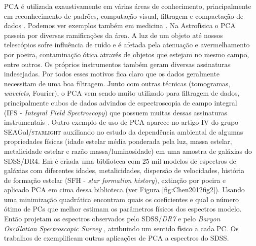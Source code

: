 \documentclass[a4paper,12pt]{article}
\def\starlight{\textsc{starlight}\xspace}      %
\def\SDSS{SDSS\xspace}           %
\begin{document}
PCA é utilizada exaustivamente em várias áreas de conhecimento, principalmente em reconhecimento de padrões, computação visual, filtragem e
compactação de dados \citep{Kamruzzaman2010, Borcea2012}. Podemos ver exemplos também em medicina \citep{Balakrishnan2013}. Na Astrofísica o PCA
passeia por diversas ramificações da área. A luz de um objeto até nossos telescópios sofre influência de ruído e é afetada pela atenuação e
avermelhamento por poeira, contaminação ótica através de objetos que estejam no mesmo campo, entre outros. Os próprios instrumentos também geram
diversas assinaturas indesejadas. Por todos esses motivos fica claro que os dados geralmente necessitam de uma boa filtragem. Junto com outras
técnicas (tomogramas, {\em wavelets}, Fourier), o PCA vem sendo muito utilizado para filtragem de dados, principalmente cubos de dados advindos de
espectroscopia de campo integral (IFS - {\em Integral Field Spectroscopy}) que possuem muitas dessas assinaturas instrumentais \citep{Riffel2011}.
Outro exemplo de uso de PCA aparece no artigo IV do grupo SEAGal/\starlight \citep{Mateus2007} auxiliando no estudo da dependência ambiental de
algumas propriedades físicas (idade estelar média ponderada pela luz, massa estelar, metalicidade estelar e razão massa/luminosidade) em uma amostra
de galáxias do \SDSS/DR4. Em \citet{Chen2012} é criada uma biblioteca com $25$ mil modelos de espectros de galáxias com diferentes idades,
metalicidades, dispersão de velocidades, história de formação estelar (SFH - {\em star formation history}), extinção por poeira e aplicado PCA em cima
dessa biblioteca (ver Figura \ref{fig:Chen2012fig2}). Usando uma minimização quadrática encontram quais os coeficientes e qual o número ótimo de PCs
que melhor estimam os parâmetros físicos dos espectros modelo. Então projetam os espectros observados pelo \SDSS/{\em DR7} \citep{Abazajian2009} e
pelo {\em Baryon Oscillation Spectroscopic Survey} \citep[BOSS;][]{Ahn2012}, atribuindo um sentido físico a cada PC. Os trabalhos de
\citet{Ferreras2006, Wild2006, Rogers2007} exemplificam outras aplicações de PCA a espectros do \SDSS.
\end{document}
